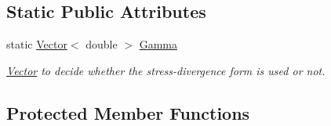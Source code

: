 \subsection*{Static Public Attributes}
\begin{DoxyCompactItemize}
\item 
static \hyperlink{classoomph_1_1Vector}{Vector}$<$ double $>$ \hyperlink{classoomph_1_1GeneralisedNewtonianAxisymmetricNavierStokesEquations_a493708aa45b87667b7ba996a059adc93}{Gamma}
\begin{DoxyCompactList}\small\item\em \hyperlink{classoomph_1_1Vector}{Vector} to decide whether the stress-\/divergence form is used or not. \end{DoxyCompactList}\end{DoxyCompactItemize}
\subsection*{Protected Member Functions}
